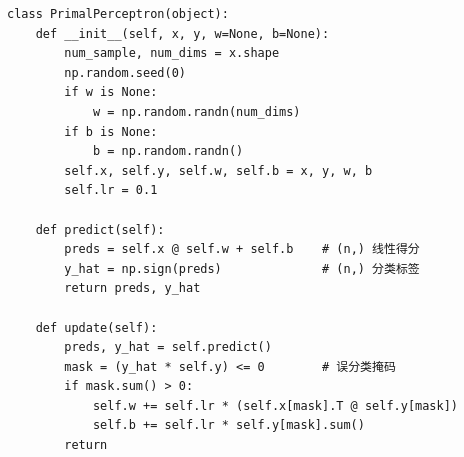 \documentclass[12pt,a4paper]{ctexart}
\begin{document}
\begin{lstlisting}
class PrimalPerceptron(object):
    def __init__(self, x, y, w=None, b=None):
        num_sample, num_dims = x.shape
        np.random.seed(0)
        if w is None:
            w = np.random.randn(num_dims)
        if b is None:
            b = np.random.randn()
        self.x, self.y, self.w, self.b = x, y, w, b
        self.lr = 0.1

    def predict(self):
        preds = self.x @ self.w + self.b    # (n,) 线性得分
        y_hat = np.sign(preds)              # (n,) 分类标签
        return preds, y_hat

    def update(self):
        preds, y_hat = self.predict()
        mask = (y_hat * self.y) <= 0        # 误分类掩码
        if mask.sum() > 0:
            self.w += self.lr * (self.x[mask].T @ self.y[mask])
            self.b += self.lr * self.y[mask].sum()
        return
\end{lstlisting}
\end{document}
